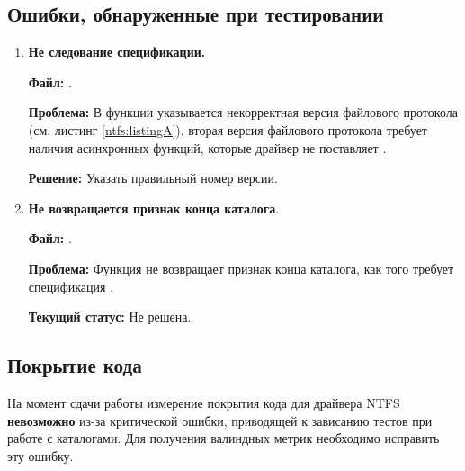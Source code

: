 \subsection{Ошибки, обнаруженные при тестировании}
\begin{enumerate}
	\item \textbf{Не следование спецификации.}
	
	\textbf{Файл:} .
	
	\textbf{Проблема:} В функции  указывается некорректная версия файлового протокола (см. листинг \ref{ntfs:listingA}), вторая версия файлового протокола требует наличия асинхронных функций, которые драйвер не поставляет \cite{UEFISpec}.
    
    \textbf{Решение:} Указать правильный номер версии.
	 
	
	\item \textbf{Не возвращается признак конца каталога}.
	
	\textbf{Файл:} .
	
	\textbf{Проблема:} Функция  не возвращает признак конца каталога, как того требует спецификация \cite{UEFISpec}.
	
	\textbf{Текущий статус:} Не решена.
\end{enumerate}

\subsection{Покрытие кода}
На момент сдачи работы измерение покрытия кода для драйвера NTFS \textbf{невозможно} из-за критической ошибки, приводящей к зависанию тестов при работе с каталогами. Для получения валиндных метрик необходимо исправить эту ошибку. 